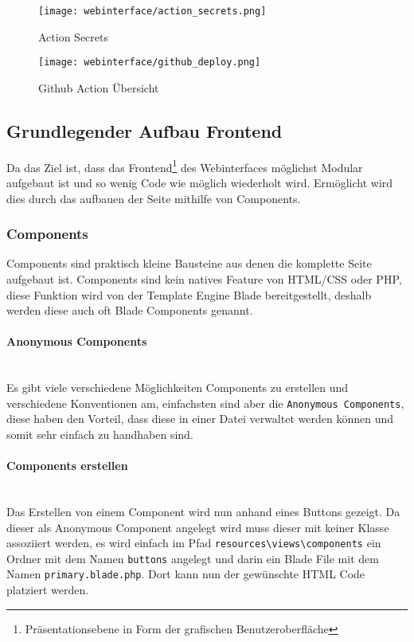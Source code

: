 \begin{figure}[H]
  \centering
  \texttt{[image: webinterface/action\_secrets.png]}
  \caption{Action Secrets}
\end{figure}

\begin{figure}[H]
  \centering
  \texttt{[image: webinterface/github\_deploy.png]}
  \caption{Github Action Übersicht}
\end{figure}


\subsection{Grundlegender Aufbau Frontend}

Da das Ziel ist, dass das Frontend\footnote{Präsentationsebene in Form der
grafischen Benutzeroberfläche} des Webinterfaces möglichst Modular aufgebaut ist
und so wenig Code wie möglich wiederholt wird. Ermöglicht wird dies durch das aufbauen
der Seite mithilfe von Components.


\subsubsection{Components}

Components sind praktisch kleine Bausteine aus denen die komplette Seite
aufgebaut ist. Components sind kein natives Feature von HTML/CSS oder PHP, diese
Funktion wird von der Template Engine Blade bereitgestellt, deshalb werden diese
auch oft Blade Components genannt. 

\paragraph{Anonymous Components}\mbox{}\\

Es gibt viele verschiedene Möglichkeiten
Components zu erstellen und verschiedene Konventionen am, einfachsten sind aber
die \verb|Anonymous Components|, diese haben den Vorteil, dass diese in einer Datei
verwaltet werden können und somit sehr einfach zu handhaben sind.

\paragraph{Components erstellen}\mbox{}\\

Das Erstellen von einem Component wird nun anhand eines Buttons gezeigt. Da
dieser als Anonymous Component angelegt wird muss dieser mit keiner Klasse
assoziiert werden, es wird einfach im Pfad
\verb|resources\views\components| ein Ordner mit dem Namen \verb|buttons|
angelegt und darin ein Blade File mit dem Namen \verb|primary.blade.php|. Dort
kann nun der gewünschte HTML Code platziert werden.

